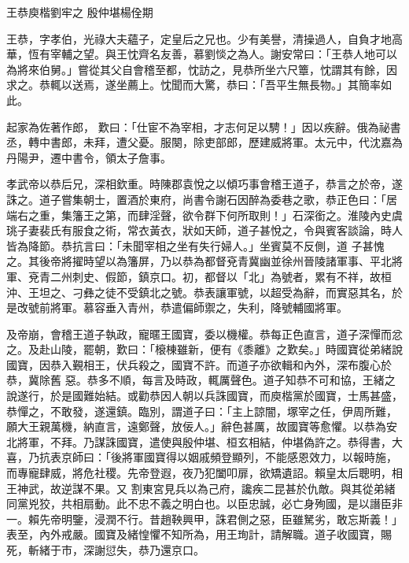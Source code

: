 
\begin{pinyinscope}
王恭庾楷劉牢之
 殷仲堪楊佺期



 王恭，字孝伯，光祿大夫蘊子，定皇后之兄也。少有美譽，清操過人，自負才地高華，恆有宰輔之望。與王忱齊名友善，慕劉惔之為人。謝安常曰：「王恭人地可以為將來伯舅。」嘗從其父自會稽至都，忱訪之，見恭所坐六尺簟，忱謂其有餘，因求之。恭輒以送焉，遂坐薦上。忱聞而大驚，恭曰：「吾平生無長物。」其簡率如此。



 起家為佐著作郎，
 歎曰：「仕宦不為宰相，才志何足以騁！」因以疾辭。俄為祕書丞，轉中書郎，未拜，遭父憂。服闋，除吏部郎，歷建威將軍。太元中，代沈嘉為丹陽尹，遷中書令，領太子詹事。



 孝武帝以恭后兄，深相欽重。時陳郡袁悅之以傾巧事會稽王道子，恭言之於帝，遂誅之。道子嘗集朝士，置酒於東府，尚書令謝石因醉為委巷之歌，恭正色曰：「居端右之重，集籓王之第，而肆淫聲，欲令群下何所取則！」石深銜之。淮陵內史虞珧子妻裴氏有服食之術，常衣黃衣，狀如天師，道子甚悅之，令與賓客談論，時人皆為降節。恭抗言曰：「未聞宰相之坐有失行婦人。」坐賓莫不反側，道
 子甚愧之。其後帝將擢時望以為籓屏，乃以恭為都督兗青冀幽並徐州晉陵諸軍事、平北將軍、兗青二州刺史、假節，鎮京口。初，都督以「北」為號者，累有不祥，故桓沖、王坦之、刁彝之徒不受鎮北之號。恭表讓軍號，以超受為辭，而實惡其名，於是改號前將軍。慕容垂入青州，恭遣偏師禦之，失利，降號輔國將軍。



 及帝崩，會稽王道子執政，寵暱王國寶，委以機權。恭每正色直言，道子深憚而忿之。及赴山陵，罷朝，歎曰：「榱棟雖新，便有《黍離》之歎矣。」時國寶從弟緒說國寶，因恭入覲相王，伏兵殺之，國寶不許。而道子亦欲輯和內外，深布腹心於恭，冀除舊
 惡。恭多不順，每言及時政，輒厲聲色。道子知恭不可和協，王緒之說遂行，於是國難始結。或勸恭因人朝以兵誅國寶，而庾楷黨於國寶，士馬甚盛，恭憚之，不敢發，遂還鎮。臨別，謂道子曰：「主上諒闇，塚宰之任，伊周所難，願大王親萬機，納直言，遠鄭聲，放佞人。」辭色甚厲，故國寶等愈懼。以恭為安北將軍，不拜。乃謀誅國寶，遣使與殷仲堪、桓玄相結，仲堪偽許之。恭得書，大喜，乃抗表京師曰：「後將軍國寶得以姻戚頻登顯列，不能感恩效力，以報時施，而專寵肆威，將危社稷。先帝登遐，夜乃犯闔叩扉，欲矯遺詔。賴皇太后聰明，相王神武，故逆謀不果。又
 割東宮見兵以為己府，讒疾二昆甚於仇敵。與其從弟緒同黨兇狡，共相扇動。此不忠不義之明白也。以臣忠誠，必亡身殉國，是以譖臣非一。賴先帝明鑒，浸潤不行。昔趙鞅興甲，誅君側之惡，臣雖駑劣，敢忘斯義！」表至，內外戒嚴。國寶及緒惶懼不知所為，用王珣計，請解職。道子收國寶，賜死，斬緒于市，深謝愆失，恭乃還京口。




\end{pinyinscope}
